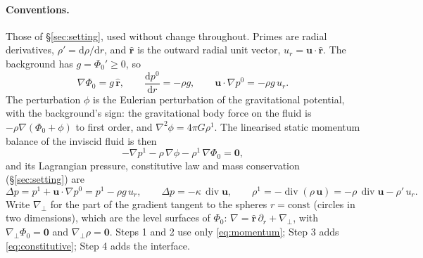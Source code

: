 \documentclass[11pt]{article}
\newcommand{\bu}{\mathbf{u}}
\newcommand{\Div}{\operatorname{div}}
\begin{document}
\paragraph{Conventions.} Those of \S\ref{sec:setting}, used without
change throughout. Primes are radial derivatives,
$\rho' = \mathrm{d}\rho/\mathrm{d}r$, and $\hat{\mathbf r}$ is the
outward radial unit vector, $u_r = \bu\cdot\hat{\mathbf r}$. The
background has $g = \Phi_0' \ge 0$, so
\begin{equation}
  \nabla\Phi_0 = g\,\hat{\mathbf r},
  \qquad
  \frac{\mathrm{d}p^0}{\mathrm{d}r} = -\rho g,
  \qquad
  \bu\cdot\nabla p^0 = -\rho g\,u_r .
  \label{eq:conv-background}
\end{equation}
The perturbation $\phi$ is the Eulerian perturbation of the
gravitational potential, with the background's sign: the gravitational
body force on the fluid is $-\rho\nabla(\Phi_0 + \phi)$ to first order,
and $\nabla^2\phi = 4\pi G\rho^1$. The linearised static momentum
balance of the inviscid fluid is then
\begin{equation}
  -\nabla p^1 - \rho\,\nabla\phi - \rho^1\,\nabla\Phi_0 = \mathbf 0 ,
  \label{eq:momentum}
\end{equation}
and its Lagrangian pressure, constitutive law and mass conservation
(\S\ref{sec:setting}) are
\begin{equation}
  \Delta p = p^1 + \bu\cdot\nabla p^0 = p^1 - \rho g\,u_r ,
  \qquad
  \Delta p = -\kappa\,\Div\bu ,
  \qquad
  \rho^1 = -\Div(\rho\,\bu) = -\rho\,\Div\bu - \rho'\,u_r .
  \label{eq:constitutive}
\end{equation}
Write $\nabla_{\!\perp}$ for the part of the gradient tangent to the
spheres $r = \text{const}$ (circles in two dimensions), which are the
level surfaces of $\Phi_0$: $\nabla = \hat{\mathbf r}\,\partial_r +
\nabla_{\!\perp}$, with $\nabla_{\!\perp}\Phi_0 = \mathbf 0$ and
$\nabla_{\!\perp}\rho = \mathbf 0$. Steps 1 and 2 use only
\eqref{eq:momentum}; Step 3 adds \eqref{eq:constitutive}; Step 4 adds
the interface.
\end{document}

